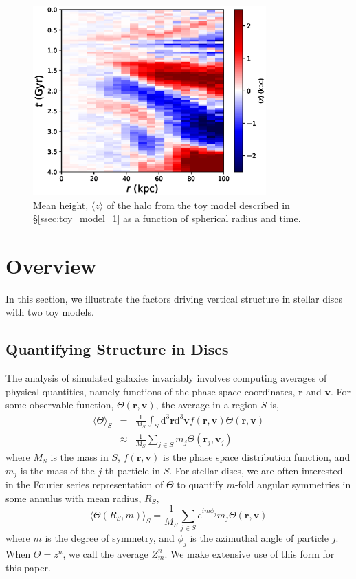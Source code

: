 \begin{figure}
	\centering
	\includegraphics[width=0.8\textwidth]{../figures/isolated_z_0_r_a_halo.eps}
	\caption{Mean height, $\langle z \rangle$ of the halo from the toy model described in \S\ref{ssec:toy_model_1} as a function of spherical radius and time.} \label{fig:toy_model_1_mean_height_halo}
\end{figure}


\section{Overview} \label{sec:overview}


In this section, we illustrate the factors driving vertical structure in stellar discs with two toy models.
\subsection{Quantifying Structure in Discs}

The analysis of simulated galaxies invariably involves computing averages of physical quantities, namely functions of the phase-space coordinates, $\textbf{r}$ and $\textbf{v}$. For some observable function,  $\Theta(\textbf{r},\textbf{v})$, the average in a region $S$ is,
\begin{eqnarray}
\langle\Theta\rangle_S &=&\frac{1}{M_S} \int_S \text{d}^3 \textbf{r} \text{d}^3\textbf{v} f(\textbf{r}, \textbf{v}) \Theta(\textbf{r}, \textbf{v})\\
&\approx& \frac{1}{M_S} \sum_{j \in S} m_j \Theta(\textbf{r}_j, \textbf{v}_j) \label{eq:z_statistic}
\end{eqnarray}
where $M_S$ is the mass in $S$, $f(\textbf{r},\textbf{v})$ is the phase space distribution function, and $m_j$ is the mass of the $j$-th particle in $S$. For stellar discs, we are often interested in the Fourier series representation of $\Theta$ to quantify $m$-fold angular symmetries in some annulus with mean radius, $R_S,$
\begin{equation}
\langle\Theta(R_S,m)\rangle_S = \frac{1}{M_S} \sum_{j \in S} e^{i m \phi_j} m_j \Theta(\textbf{r}, \textbf{v})
\end{equation}
where $m$ is the degree of symmetry, and $\phi_j$ is the azimuthal angle of particle $j$. When $\Theta = z^n$, we call the average $Z_m^n$. We make extensive use of this form for this paper.

